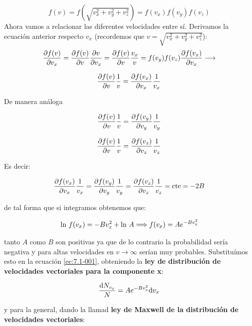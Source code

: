 \documentclass[12pt]{book}
\begin{document}
\begin{equation}
f(v) = f(\sqrt{v_x^2 + v_y^2 + v_z^2}) = f(v_x) f(v_y) f(v_z) 
\end{equation}
Ahora vamos a relacionar las diferentes velocidades entre sí. Derivamos la ecuación anterior respecto $v_x$ (recordemos que $v= \sqrt{v_x^2 + v_y^2 + v_z^2}$):
$$
 \frac{\partial f(v)}{\partial v_x} = \frac{\partial f(v)}{\partial v} \frac{\partial v}{\partial v_x} = \frac{\partial f(v)}{\partial v} \dfrac{v_x}{v} = f(v_y) f(v_z) \frac{\partial f(v_x)}{\partial v_x} \longrightarrow  
$$

\begin{equation}
\frac{\partial f(v)}{\partial v} \dfrac{1}{v} =
\frac{\partial f(v_x)}{\partial v_x} \dfrac{1}{v_x}
\end{equation}


De manera análoga


\begin{equation}
\frac{\partial f(v)}{\partial v} \dfrac{1}{v} = 
\frac{\partial f(v_y)}{\partial v_y} \dfrac{1}{v_y}
\end{equation}


\begin{equation}
\frac{\partial f(v)}{\partial v} \dfrac{1}{v} = 
\frac{\partial f(v_z)}{\partial v_z} \dfrac{1}{v_z}
\end{equation}

Es decir:

\begin{equation}
\frac{\partial f(v_x)}{\partial v_x} \dfrac{1}{v_x} =
\frac{\partial f(v_y)}{\partial v_y} \dfrac{1}{v_y}= 
\frac{\partial f(v_z)}{\partial v_z} \dfrac{1}{v_z} = \mathrm{cte} = - 2B
\end{equation}

de tal forma que si integramos obtenemos que:

\begin{equation}
\mathrm{ln} \  f(v_x) = - B v_x^2 + \mathrm{ln} \  A \Longrightarrow f(v_x) = A e^{- B v_x^2}
\end{equation}

tanto $A$ como $B$ son positivas ya que de lo contrario la probabilidad sería negativa y para altas velocidades en $v \rightarrow \infty$ serían muy probables. Substituímos esto en la ecuación \ref{ec:7.1-001}, obteniendo la \textbf{ley de distribución de velocidades vectoriales para la componente x}:

\begin{equation}
\dfrac{\mathrm{d} N_{v_x}}{N} = A e^{-Bv_x^2} \mathrm{d} v_x  \label{ec:7.1-011}
\end{equation}

y para la general, dando la llamad \textbf{ley de Maxwell de la distribución de velocidades vectoriales}:
\end{document}
